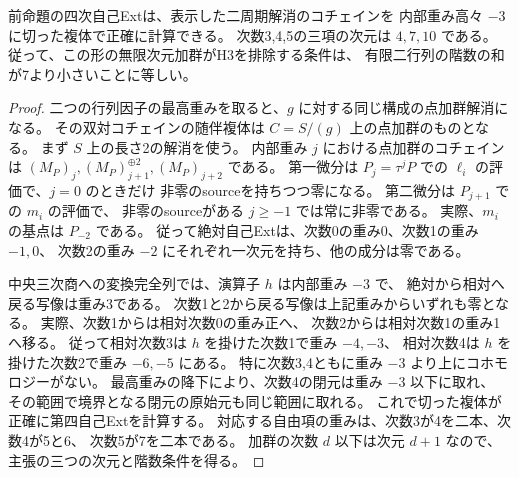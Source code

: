 \begin{corollary}\label{cor:cubic-CY-three-alpha-elliptic-line-finite-pd-test}
前命題の四次自己Extは、表示した二周期解消のコチェインを
内部重み高々 $-3$ に切った複体で正確に計算できる。
次数3,4,5の三項の次元は $4,7,10$ である。
従って、この形の無限次元加群がH3を排除する条件は、
有限二行列の階数の和が7より小さいことに等しい。
\end{corollary}
\begin{proof}
二つの行列因子の最高重みを取ると、$g$ に対する同じ構成の点加群解消になる。
その双対コチェインの随伴複体は $C=S/(g)$ 上の点加群のものとなる。
まず $S$ 上の長さ2の解消を使う。
内部重み $j$ における点加群のコチェインは
$(M_P)_j,(M_P)_{j+1}^{\oplus2},(M_P)_{j+2}$ である。
第一微分は $P_j=\tau^jP$ での $\ell_i$ の評価で、$j=0$ のときだけ
非零のsourceを持ちつつ零になる。
第二微分は $P_{j+1}$ での $m_i$ の評価で、
非零のsourceがある $j\ge-1$ では常に非零である。
実際、$m_i$ の基点は $P_{-2}$ である。
従って絶対自己Extは、次数0の重み0、次数1の重み $-1,0$、
次数2の重み $-2$ にそれぞれ一次元を持ち、他の成分は零である。

中央三次商への変換完全列では、演算子 $h$ は内部重み $-3$ で、
絶対から相対へ戻る写像は重み3である。
次数1と2から戻る写像は上記重みからいずれも零となる。
実際、次数1からは相対次数0の重み正へ、
次数2からは相対次数1の重み1へ移る。
従って相対次数3は $h$ を掛けた次数1で重み $-4,-3$、
相対次数4は $h$ を掛けた次数2で重み $-6,-5$ にある。
特に次数3,4ともに重み $-3$ より上にコホモロジーがない。
最高重みの降下により、次数4の閉元は重み $-3$ 以下に取れ、
その範囲で境界となる閉元の原始元も同じ範囲に取れる。
これで切った複体が正確に第四自己Extを計算する。
対応する自由項の重みは、次数3が4を二本、次数4が5と6、
次数5が7を二本である。
加群の次数 $d$ 以下は次元 $d+1$ なので、主張の三つの次元と階数条件を得る。
\end{proof}

